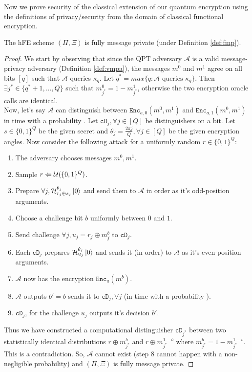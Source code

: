 Now we prove security of the classical extension of our quantum encryption using the definitions of privacy/security from the domain of classical functional encryption.

\begin{theorem}
\label{thm:pixi-msgpriv}
The hFE scheme $(\Pi,\Xi)$ is fully message private (under Definition \ref{def:fmp}).
\end{theorem}
\begin{proof}
We start by observing that since the QPT adversary $\mathcal{A}$ is a valid message-privacy adversary (Definition \ref{def:vmpa}), the messages $m^0$ and $m^1$ agree on all bits $[q]$ such that $\mathcal{A}$ queries $\kappa_q$. Let $q^* = max \{q : \mathcal{A} \text{ queries } \kappa_q \}$. Then $\exists j^* \in \{ q^*+1, ..., Q \}$ such that $m^0_{j^*} = 1 - m^1_{j^*}$, otherwise the two encryption oracle calls are identical. \\
Now, let's say $\mathcal{A}$ can distinguish between $\texttt{Enc}_{a,0}(m^0,m^1)$ and $\texttt{Enc}_{a,1}(m^0,m^1)$ in time \poly with a probability \nonegl. Let $\texttt{cD}_j, \forall j \in [Q]$ be  distinguishers on a bit. Let $s \in \{ 0,1 \}^Q$ be the given secret and $\theta_j = \frac{2 \pi j}{Q}, \forall j \in [Q]$ be the given encryption angles. Now consider the following attack for a uniformly random $r \in \{ 0,1 \}^Q$: \\
\vspace*{-8pt}
\begin{enumerate}
\item The adversary chooses messages $m^0,m^1$.
\item Sample $r \Leftarrow \mathcal{U}(\{0,1\}^Q)$.
\item Prepare $\forall j, \mathcal{H}^{\theta_j}_{r_j \oplus s_j}\ket{0}$ and send them to $\mathcal{A}$ in order as it's odd-position arguments.
\item Choose a challenge bit $b$ uniformly between $0$ and $1$.
\item Send challenge $\forall j, u_j = r_j \oplus m^b_j$ to $\texttt{cD}_j$.
\item Each $\texttt{cD}_j$ prepares $\mathcal{H}^{\theta_j}_{u_j}\ket{0}$ and sends it (in order) to $\mathcal{A}$ as it's even-position arguments.
\item $\mathcal{A}$ now has the encryption $\texttt{Enc}_a(m^b)$.
\item $\mathcal{A}$ outputs $b' = b$ sends it to $\texttt{cD}_j ,\forall j$ (in time \poly \text{ } with a probability \nonegl).
\item $\texttt{cD}_j$, for the challenge $u_j$ outputs it's decision $b'$.
\end{enumerate}
Thus we have constructed a computational distinguisher $\texttt{cD}_{j^*}$ between two statistically identical distributions $r \oplus m^b_{j^*}$ and $r \oplus m^{1-b}_{j^*}$ where 
$m^b_{j^*} = 1 - m^{1-b}_{j^*}$. This is a contradiction. So, $\mathcal{A}$ cannot exist (step 8 cannot happen with a non-negligible probability) and $(\Pi,\Xi)$ is fully message private.
\end{proof}

